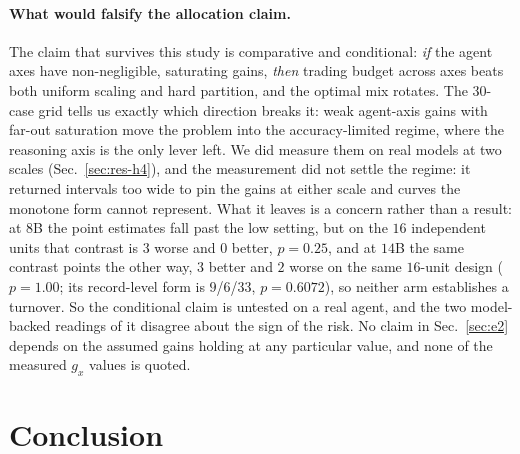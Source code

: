 \documentclass[10pt]{article} %
\begin{document}
\paragraph{What would falsify the allocation claim.}
The claim that survives this study is comparative and conditional: \emph{if} the
agent axes have non-negligible, saturating gains, \emph{then} trading budget
across axes beats both uniform scaling and hard partition, and the optimal mix
rotates. The $30$-case grid tells us exactly which direction breaks it: weak
agent-axis gains with far-out saturation move the problem into the
accuracy-limited regime, where the reasoning axis is the only lever left. We did
measure them on real models at two scales (Sec.~\ref{sec:res-h4}), and the measurement did not
settle the regime: it returned intervals too wide to pin the gains at either scale and
curves the monotone form cannot represent. What it leaves is a concern rather than a
result: at $8$B the point estimates fall past the low setting, but on the $16$ independent
units that contrast is $3$ worse and $0$ better, $p{=}0.25$, and at $14$B the same contrast
points the other way, $3$ better and $2$ worse on the same $16$-unit design ($p{=}1.00$; its
record-level form is $9$/$6$/$33$, $p{=}0.6072$), so neither arm establishes a turnover. So the
conditional claim is untested on a real agent, and the two model-backed readings of it
disagree about the sign of the risk.
No claim in Sec.~\ref{sec:e2} depends on the assumed gains holding at any
particular value, and none of the measured $g_x$ values is quoted.

\section{Conclusion}
\end{document}

